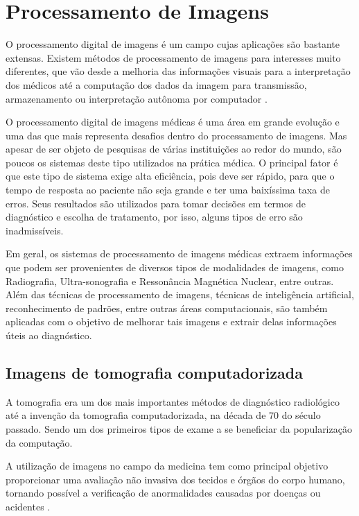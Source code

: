 \chapter{Processamento de Imagens}

O processamento digital de imagens é um campo cujas aplicações são bastante extensas. Existem métodos de processamento de imagens para interesses muito diferentes, que vão desde a melhoria das informações visuais para a interpretação dos médicos até a computação dos dados da imagem para transmissão, armazenamento ou interpretação autônoma por computador \cite{gonzalez}.

O processamento digital de imagens médicas é uma área em grande evolução e uma das que mais representa desafios dentro do processamento de imagens. Mas apesar de ser objeto de pesquisas de várias instituições ao redor do mundo, são poucos os sistemas deste tipo utilizados na prática médica. O principal fator é que este tipo de sistema exige alta eficiência, pois deve ser rápido, para que o tempo de resposta ao paciente não seja grande e ter uma baixíssima taxa de erros. Seus resultados são utilizados para tomar decisões em termos de diagnóstico e escolha de tratamento, por isso, alguns tipos de erro são inadmissíveis.

Em geral, os sistemas de processamento de imagens médicas extraem informações que podem ser provenientes de diversos tipos de modalidades de imagens, como Radiografia, Ultra-sonografia e Ressonância Magnética Nuclear, entre outras. Além das técnicas de processamento de imagens, técnicas de inteligência artificial, reconhecimento de padrões, entre outras áreas computacionais, são também aplicadas com o objetivo de melhorar tais imagens e extrair delas informações úteis ao diagnóstico.

\section{Imagens de tomografia computadorizada}

A tomografia era um dos mais importantes métodos de diagnóstico radiológico até a invenção da tomografia computadorizada, na década de 70 do século passado. Sendo um dos primeiros tipos de exame a se beneficiar da popularização da computação.

A utilização de imagens no campo da medicina tem como principal objetivo proporcionar uma avaliação não invasiva dos tecidos e órgãos do corpo humano, tornando possível a verificação de anormalidades causadas por doenças ou acidentes \cite{oliveira}.

